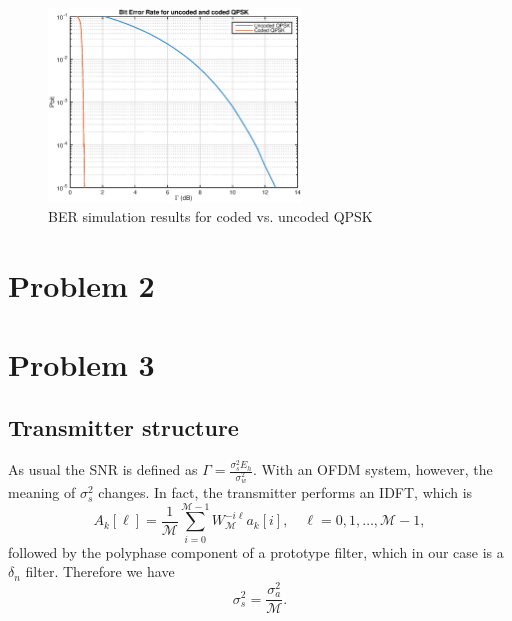 \documentclass[10pt]{article}
\newcommand{\ofdM} {\mathcal{M}}
\begin{document}
\begin{figure}
	\centering
	\includegraphics[width = 0.6\textwidth]{problem1}
	\caption{BER simulation results for coded vs. uncoded QPSK}
	\label{fig:problem1_pbit}
\end{figure}




\section*{Problem 2}


\section*{Problem 3}

\subsection*{Transmitter structure}


As usual the SNR is defined as $\Gamma = \frac{\sigma_s^2 E_h}{\sigma_w^2}$. With an OFDM system, however, the meaning of $\sigma_s^2$ changes. In fact, the transmitter performs an IDFT, which is
\begin{equation}
	A_k[\ell] = \frac{1}{\ofdM} \sum_{i = 0}^{\ofdM - 1} W_{\ofdM}^{-i\ell} a_k[i], \quad \ell = 0, 1, \dots, \ofdM-1,
\end{equation}
followed by the polyphase component of a prototype filter, which in our case is a $\delta_n$ filter. Therefore we have 
\begin{equation}
	\sigma_s^2 = \dfrac{\sigma_a^2}{\ofdM}.
\end{equation}
\end{document}
